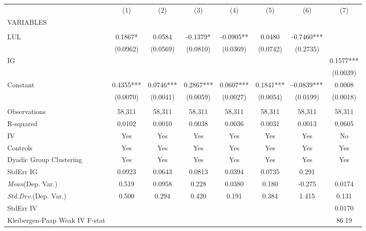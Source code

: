 \documentclass[]{article}
\begin{document}
\begin{tabular}{lccccccc} \hline
 & (1) & (2) & (3) & (4) & (5) & (6) & (7) \\
VARIABLES &  &  &  &  &  &  &  \\ \hline
 &  &  &  &  &  &  &  \\
LUL & 0.1867* & 0.0584 & -0.1379* & -0.0905** & 0.0480 & -0.7460*** &  \\
 & (0.0962) & (0.0569) & (0.0810) & (0.0369) & (0.0742) & (0.2735) &  \\
IG &  &  &  &  &  &  & 0.1577*** \\
 &  &  &  &  &  &  & (0.0039) \\
Constant & 0.4355*** & 0.0746*** & 0.2867*** & 0.0607*** & 0.1841*** & -0.0839*** & 0.0008 \\
 & (0.0070) & (0.0041) & (0.0059) & (0.0027) & (0.0054) & (0.0199) & (0.0018) \\
 &  &  &  &  &  &  &  \\
Observations & 58,311 & 58,311 & 58,311 & 58,311 & 58,311 & 58,311 & 58,311 \\
R-squared & 0.0102 & 0.0010 & 0.0038 & 0.0036 & 0.0031 & 0.0013 & 0.0605 \\
IV & Yes & Yes & Yes & Yes & Yes & Yes & No \\
Controls & Yes & Yes & Yes & Yes & Yes & Yes & Yes \\
Dyadic Group Clustering & Yes & Yes & Yes & Yes & Yes & Yes & Yes \\
StdErr IG & 0.0923 & 0.0643 & 0.0813 & 0.0394 & 0.0735 & 0.291 &  \\
\textit{Mean}(Dep. Var.) & 0.519 & 0.0958 & 0.228 & 0.0380 & 0.180 & -0.275 & 0.0174 \\
\textit{Std.Dev.}(Dep. Var.) & 0.500 & 0.294 & 0.420 & 0.191 & 0.384 & 1.415 & 0.131 \\
StdErr IV &  &  &  &  &  &  & 0.0170 \\
 Kleibergen-Paap Weak IV F-stat &  &  &  &  &  &  & 86.19 \\ \hline
\end{tabular}
\end{document}
